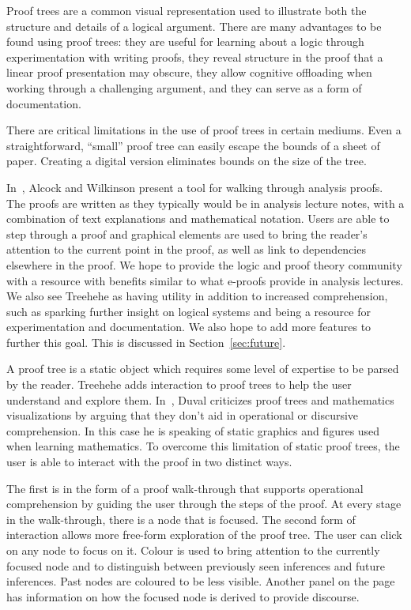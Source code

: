 \documentclass[conference]{IEEEtran}
\newcommand{\projectname}{Treehehe}
\begin{document}
Proof trees are a common visual representation used to illustrate both the structure and details of a logical argument. There are many advantages to be found using proof trees: they are useful for learning about a logic through experimentation with writing proofs, they reveal structure in the proof that a linear proof presentation may obscure, they allow cognitive offloading when working through a challenging argument, and they can serve as a form of documentation.

There are critical limitations in the use of proof trees in certain mediums. Even a straightforward, ``small'' proof tree can easily escape the bounds of a sheet of paper. Creating a digital version eliminates bounds on the size of the tree.

In~\cite{eproofs-alcock+wilkinson}, Alcock and Wilkinson present a tool for walking through analysis proofs. The proofs are written as they typically would be in analysis lecture notes, with a combination of text explanations and mathematical notation. Users are able to step through a proof and graphical elements are used to bring the reader's attention to the current point in the proof, as well as link to dependencies elsewhere in the proof. We hope to provide the logic and proof theory community with a resource with benefits similar to what e-proofs provide in analysis lectures. We also see \projectname{} as having utility in addition to increased comprehension, such as sparking further insight on logical systems and being a resource for experimentation and documentation. We also hope to add more features to further this goal. This is discussed in Section~\ref{sec:future}.

A proof tree is a static object which requires some level of expertise to be parsed by the reader. \projectname{} adds interaction to proof trees to help the user understand and explore them. In~\cite{repvisvis-duval}, Duval criticizes proof trees and mathematics visualizations by arguing that they don’t aid in operational or discursive comprehension. In this case he is speaking of static graphics and figures used when learning mathematics. To overcome this limitation of static proof trees, the user is able to interact with the proof in two distinct ways.

The first is in the form of a proof walk-through that supports operational comprehension by guiding the user through the steps of the proof. At every stage in the walk-through, there is a node that is focused. The second form of interaction allows more free-form exploration of the proof tree. The user can click on any node to focus on it. Colour is used to bring attention to the currently focused node and to distinguish between previously seen inferences and future inferences. Past nodes are coloured to be less visible. Another panel on the page has information on how the focused node is derived to provide discourse.
\end{document}
